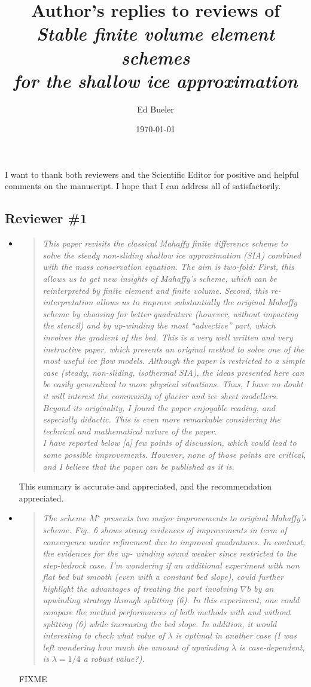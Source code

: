 \documentclass[11pt,reqno]{amsart}
\title[Author's replies to reviews of \emph{Stable finite volume element schemes \dots}]{Author's replies to reviews of \\ \emph{Stable finite volume element schemes} \\ \emph{for the shallow ice approximation}}
\author{Ed Bueler}
\date{\today}
\newcommand{\grad}{\nabla}
\newcommand{\reply}[2]{
\medskip\medskip
\item  \begin{quote}
\emph{#1}
\end{quote}

\medskip
\noindent #2}
\begin{document}
\maketitle

\thispagestyle{empty}



I want to thank both reviewers and the Scientific Editor for positive and helpful comments on the manuscript.  I hope that I can address all of satisfactorily.


\subsection*{Reviewer \#1}  \begin{itemize}
\reply{This paper revisits the classical Mahaffy finite difference scheme to solve the steady
non-sliding shallow ice approximation (SIA) combined with the mass conservation equation.  The aim is two-fold: First, this allows us to get new insights of Mahaffy's
scheme, which can be reinterpreted by finite element and finite volume. Second, this
re-interpretation allows us to improve substantially the original Mahaffy scheme by
choosing for better quadrature (however, without impacting the stencil) and by up-winding the most ``advective'' part, which involves the gradient of the bed.
This is a very well written and very instructive paper, which presents an original
method to solve one of the most useful ice flow models. Although the paper is restricted
to a simple case (steady, non-sliding, isothermal SIA), the ideas presented here can be
easily generalized to more physical situations. Thus, I have no doubt it will interest the
community of glacier and ice sheet modellers. Beyond its originality, I found the paper
enjoyable reading, and especially didactic. This is even more remarkable considering
the technical and mathematical nature of the paper. \medskip \\
\indent I have reported below [a] few points of discussion, which could lead to some possible
improvements. However, none of those points are critical, and I believe that the paper
can be published as it is.}
{This summary is accurate and appreciated, and the recommendation appreciated.}

\reply{The scheme $M^\star$ presents two major improvements to original Mahaffy's scheme.
Fig.~6 shows strong evidences of improvements in term of convergence under
refinement due to improved quadratures. In contrast, the evidences for the up-
winding sound weaker since restricted to the step-bedrock case. I'm wondering
if an additional experiment with non flat bed but smooth (even with a constant
bed slope), could further highlight the advantages of treating the part involving
$\grad b$ by an upwinding strategy through splitting (6).  In this experiment, one could
compare the method performances of both methods with and without splitting
(6) while increasing the bed slope. In addition, it would interesting to check what
value of $\lambda$ is optimal in another case (I was left wondering how much the amount
of upwinding $\lambda$ is case-dependent, is $\lambda = 1/4$ a robust value?).}
{FIXME}


\end{itemize}
\end{document}
